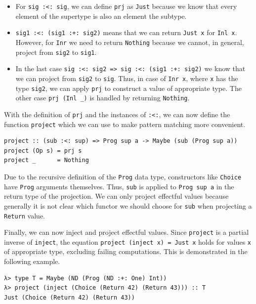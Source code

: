 \documentclass[a4paper, 11pt, fleqn, twoside]{scrreprt}
\newcommand{\todo}[1]{\marginpar{\textbf{TODO:} #1}}
\newcommand{\hinl}[1]{\texttt{#1}}
\begin{document}
\begin{itemize}
\item For \hinl{sig :<: sig}, we can define \hinl{prj} as \hinl{Just} because we know that every element of the supertype is also an element the subtype.

\item \hinl{sig1 :<: (sig1 :+: sig2)} means that we can return \hinl{Just x} for \hinl{Inl x}.
However, for \hinl{Inr} we need to return \hinl{Nothing} because we cannot, in general, project from \hinl{sig2} to \hinl{sig1}.

\item In the last case \hinl{sig :<: sig2 => sig :<: (sig1 :+: sig2)} we know that we can project from \hinl{sig2} to \hinl{sig}.
Thus, in case of \hinl{Inr x}, where \hinl{x} has the type \hinl{sig2}, we can apply \hinl{prj} to construct a value of appropriate type.
The other case \hinl{prj (Inl _)} is handled by returning \hinl{Nothing}.
\end{itemize}

With the definition of \hinl{prj} and the instances of \hinl{:<:}, we can now define the function \hinl{project} which we can use to make pattern matching more convenient.

\begin{verbatim}
project :: (sub :<: sup) => Prog sup a -> Maybe (sub (Prog sup a))
project (Op s) = prj s
project _      = Nothing
\end{verbatim}

Due to the recursive definition of the \hinl{Prog} data type, constructors like \hinl{Choice} have \hinl{Prog} arguments themselves.
Thus, \hinl{sub} is applied to \hinl{Prog sup a} in the return type of the projection.
We can only project effectful values because generally it is not clear which functor we should choose for \hinl{sub} when projecting a \hinl{Return} value.

Finally, we can now inject and project effectful values.
Since \hinl{project} is a partial inverse of \hinl{inject}, the equation \hinl{project (inject x) = Just x} holds for values \hinl{x} of appropriate type, excluding failing computations.
\todo{Does it hold?}
This is demonstrated in the following example.

\begin{verbatim}
λ> type T = Maybe (ND (Prog (ND :+: One) Int))
λ> project (inject (Choice (Return 42) (Return 43))) :: T
Just (Choice (Return 42) (Return 43))
\end{verbatim}
\end{document}
